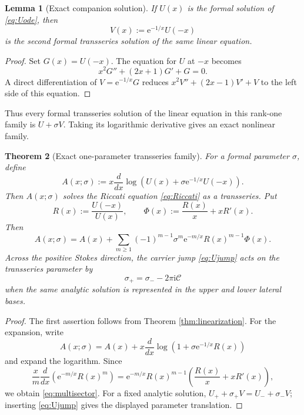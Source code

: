 \documentclass[11pt,a4paper]{article}
\newtheorem{theorem}{Theorem}[section]
\newtheorem{lemma}[theorem]{Lemma}
\theoremstyle{definition}
\theoremstyle{remark}
\newcommand{\ii}{\mathrm{i}}
\newcommand{\e}{\mathrm{e}}
\newcommand{\constC}{\mathcal{C}}
\begin{document}
\begin{lemma}[Exact companion solution]\label{lem:companion}
If \(U(x)\) is the formal solution of \eqref{eq:Uode}, then
\begin{equation}\label{eq:Vdef}
 V(x):=\e^{-1/x}U(-x)
\end{equation}
is the second formal transseries solution of the same linear equation.
\end{lemma}

\begin{proof}
Set \(G(x)=U(-x)\).  The equation for \(U\) at \(-x\) becomes
\[
 x^2G''+(2x+1)G'+G=0.
\]
A direct differentiation of \(V=\e^{-1/x}G\) reduces \(x^2V''+(2x-1)V'+V\) to the left side of this equation.
\end{proof}

Thus every formal transseries solution of the linear equation in this rank-one family is \(U+\sigma V\).  Taking its logarithmic derivative gives an exact nonlinear family.

\begin{theorem}[Exact one-parameter transseries family]\label{thm:transseries}
For a formal parameter \(\sigma\), define
\begin{equation}\label{eq:Asigma}
 A(x;\sigma):=x\frac{d}{dx}\log\left(U(x)+\sigma\e^{-1/x}U(-x)\right).
\end{equation}
Then \(A(x;\sigma)\) solves the Riccati equation \eqref{eq:Riccati} as a transseries.  Put
\begin{equation}\label{eq:Rphi}
 R(x):=\frac{U(-x)}{U(x)},
 \qquad
 \Phi(x):=\frac{R(x)}{x}+xR'(x).
\end{equation}
Then
\begin{equation}\label{eq:multisector}
 A(x;\sigma)=A(x)+\sum_{m\ge1}(-1)^{m-1}
 \sigma^m\e^{-m/x}R(x)^{m-1}\Phi(x).
\end{equation}
Across the positive Stokes direction, the carrier jump \eqref{eq:Ujump} acts on the transseries parameter by
\[
 \sigma_+=\sigma_- -2\pi\ii\constC
\]
when the same analytic solution is represented in the upper and lower lateral bases.
\end{theorem}

\begin{proof}
The first assertion follows from Theorem \ref{thm:linearization}.  For the expansion, write
\[
 A(x;\sigma)=A(x)+x\frac{d}{dx}
 \log\left(1+\sigma\e^{-1/x}R(x)\right)
\]
and expand the logarithm.  Since
\[
 \frac{x}{m}\frac{d}{dx}
 \left(\e^{-m/x}R(x)^m\right)
 =\e^{-m/x}R(x)^{m-1}\left(\frac{R(x)}{x}+xR'(x)\right),
\]
we obtain \eqref{eq:multisector}.  For a fixed analytic solution,
\(U_++\sigma_+V=U_-+\sigma_-V\); inserting \eqref{eq:Ujump} gives the displayed parameter translation.
\end{proof}
\end{document}
